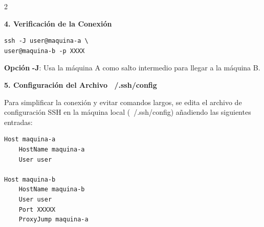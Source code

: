 \begin{multicols*}{2}
\vspace{\baselineskip}

\noindent\textbf{4. Verificación de la Conexión}

\begin{center}
\begin{minipage}{0.95\linewidth}
\begin{verbatim}
ssh -J user@maquina-a \ 
user@maquina-b -p XXXX
\end{verbatim}
\end{minipage}
\end{center}
\textbf{Opción } \textbf{-J}: Usa la máquina A como salto intermedio para llegar a la máquina B.

\vspace{\baselineskip}

\noindent\textbf{5. Configuración del Archivo ~/.ssh/config}

Para simplificar la conexión y evitar comandos largos, se edita el archivo de configuración SSH en la máquina local (~/.ssh/config) añadiendo las siguientes entradas:

\begin{center}
\begin{minipage}{0.95\linewidth}
\begin{verbatim}
Host maquina-a
    HostName maquina-a
    User user

Host maquina-b
    HostName maquina-b
    User user
    Port XXXXX
    ProxyJump maquina-a
\end{verbatim}
\end{minipage}
\end{center}



\end{multicols*}

